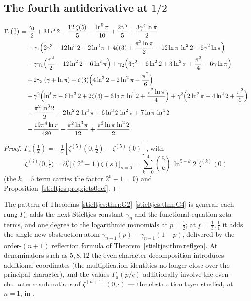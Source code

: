 \subsection{The fourth antiderivative at \texorpdfstring{$1/2$}{1/2}}

\begin{theorem}[$\Gamma_{\!4}(1/2)$]\label{stieltjes:thm:G4}
\begin{align*}
\Gamma_{\!4}\bigl(\tfrac12\bigr)
&=\frac{\gamma_4}{2}+3\ln^5 2-\frac{12\,\zeta(5)}{5}-\frac{\ln^5\pi}{10}
+\frac{2\gamma^5}{5}+\frac{3\gamma^4\ln\pi}{2}\\
&\quad+\gamma_1\Bigl(2\gamma^3-12\ln^3 2+2\ln^3\pi+4\zeta(3)
+\frac{\pi^2\ln\pi}{2}-12\ln\pi\,\ln^2 2+6\gamma^2\ln\pi\Bigr)\\
&\quad+\gamma\gamma_1\Bigl(\frac{\pi^2}{2}-12\ln^2 2+6\ln^2\pi\Bigr)
+\gamma_2\Bigl(3\gamma^2-6\ln^2 2+3\ln^2\pi+\frac{\pi^2}{4}+6\gamma\ln\pi\Bigr)\\
&\quad+2\gamma_3\,(\gamma+\ln\pi)
+\zeta(3)\Bigl(4\ln^2 2-2\ln^2\pi-\frac{\pi^2}{6}\Bigr)\\
&\quad+\gamma^2\Bigl(\ln^3\pi-6\ln^3 2+2\zeta(3)-6\ln\pi\,\ln^2 2
+\frac{\pi^2\ln\pi}{4}\Bigr)
+\gamma^3\Bigl(2\ln^2\pi-4\ln^2 2+\frac{\pi^2}{6}\Bigr)\\
&\quad+\frac{\pi^2\ln^3 2}{2}+2\ln^2 2\,\ln^3\pi+6\ln^3 2\,\ln^2\pi
+7\ln\pi\,\ln^4 2\\
&\quad-\frac{19\pi^4\ln\pi}{480}-\frac{\pi^2\ln^3\pi}{12}
+\frac{\pi^2\ln\pi\,\ln^2 2}{2}.
\end{align*}
\end{theorem}

\begin{proof}
$\Gamma_{\!4}(\tfrac12)=-\tfrac15[\zeta^{(5)}(0,\tfrac12)-\zeta^{(5)}(0)]$, with
\[
\zeta^{(5)}\bigl(0,\tfrac12\bigr)=\partial_s^5\bigl[(2^s-1)\zeta(s)\bigr]_{s=0}
=\sum_{k=0}^{4}\binom5k\,\ln^{5-k}2\;\zeta^{(k)}(0)
\]
(the $k=5$ term carries the factor $2^0-1=0$) and
Proposition~\ref{stieltjes:prop:jets0def}.
\end{proof}

The pattern of Theorems \ref{stieltjes:thm:G2}--\ref{stieltjes:thm:G4} is general: each rung
$\Gamma_{\!n}$ adds the next Stieltjes constant $\gamma_n$ and the functional-equation zeta terms,
and one degree to the logarithmic monomials at $p=\tfrac12$; at
$p=\tfrac13,\tfrac14$ it adds the single new obstruction atom
$\gamma_{n+1}(p)-\gamma_{n+1}(1-p)$, delivered by the order-$(n+1)$
reflection formula of Theorem~\ref{stieltjes:thm:reflgen}. At denominators such as $5,8,12$ the even character decomposition introduces additional coordinates (the multiplication identities no
longer close over the principal character), and the values
$\Gamma_{\!n}(p/q)$ additionally involve the even-character combinations of
$\zeta^{(n+1)}(0,\cdot)$ — the obstruction layer studied, at $n=1$, in
\cite{bridge:BlagouchineJNT}.

